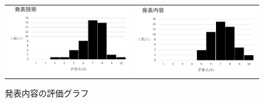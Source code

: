 \begin{figure}[h]
 \begin{tabular}{cc}
  \begin{minipage}[h]{0.45\hsize}
  \centering
 \includegraphics[width=0.7\linewidth]{./figure/gizyutu2.jpg}
\caption{発表技術の評価グラフ}
\label{gizyutu2}
 \end{minipage} &

\begin{minipage}[h]{0.45\hsize}
  \centering
 \includegraphics[width=0.7\linewidth]{./figure/naiyou2.jpg}
 \caption{発表内容の評価グラフ}
\label{naiyou2}
\end{minipage} 
\end{tabular}
\end{figure}

